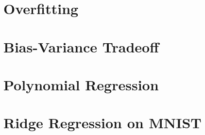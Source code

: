 \documentclass[]{article}
\begin{document}
\section*{Overfitting}

\section*{Bias-Variance Tradeoff}

\section*{Polynomial Regression}

\section*{Ridge Regression on MNIST}
\end{document}
